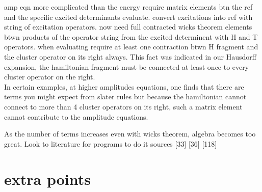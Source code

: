 \documentclass[10pt, draft]{article}
\begin{document}
 amp eqn more complicated than the energy require matrix elements btn the ref and the specific excited determinants evaluate. convert excitations into ref with string of excitation operators.  now need full contracted wicks theorem elements btwn products of the operator string from the excited determinent with H and T operators.  when evaluating require at least one contraction btwn H fragment and the cluster operator on its right always. This fact was indicated in our Hausdorff expansion, the hamiltonian fragment must be connected at least once to every cluster operator on the right.  \\
 
 In certain examples, at higher amplitudes equations, one finds that there are terms you might expect from slater rules but because the hamiltonian cannot connect to more than 4 cluster operators on its right, such a matrix element cannot contribute to the amplitude equations.\linebreak[1]
 
 As the number of terms increases even with wicks theorem, algebra becomes too great.  Look to literature for programs to do it sources [33] [36] [118]
\break
\section*{extra points}
\end{document}
